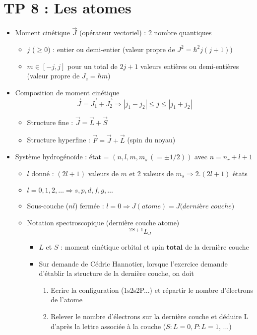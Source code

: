 
\section*{TP 8 : Les atomes}
\begin{itemize}
	\item Moment cinétique $\vec{J}$ (opérateur vectoriel) : 2 nombre quantiques
		\begin{itemize}
			\item $j$ ($\geq 0$) : entier ou demi-entier (valeur propre de $J^2 = \hbar ^2 j(j+1)$)
			\item $m \in [-j,j]$ pour un total de $2j +1$ valeurs entières ou demi-entières (valeur propre de $J_z = \hbar m$)
		\end{itemize}
		
	\item Composition de moment cinétique
	\begin{equation}
		\vec{J} = \vec{J_1}+\vec{J_2} \Rightarrow |j_1-j_2| \leq j \leq |j_1+j_2|
	\end{equation}
	\begin{itemize}
		\item Structure fine : $\vec{J}=\vec{L}+\vec{S}$
		\item Structure hyperfine : $\vec{F} = \vec{J}+\vec{L}$ (spin du noyau)
	\end{itemize}
	
	\item Système hydrogénoïde : état = $(n,l,m,m_s \, (= \pm 1/2))$ avec $n = n_r+l+1$
	\begin{itemize}
		\item $l$ donné : $(2l+1)$ valeurs de $m$ et 2 valeurs de $m_s \Rightarrow 2.(2l+1)$ états
		
		\item $l = 0,1,2, \dots \Rightarrow s,p,d,f,g,\dots$
		
		\item Sous-couche ($nl$) fermée : $l = 0 \Rightarrow J(atome) = J(dernière$ $couche)$
		
		\item Notation spectroscopique (dernière couche atome)
		\begin{equation}
			^{2S+1}L_J
		\end{equation}
		\begin{itemize}
			\item $L$ et $S$ : moment cinétique orbital et spin \textbf{total} de la dernière couche
			
			\item Sur demande de Cédric Hannotier, lorsque l'exercice demande d'établir la structure de la dernière couche, on doit 
			\begin{enumerate}
				\item Ecrire la configuration (1s2s2P...) et répartir le nombre d'électrons de l'atome
				\item Relever le nombre d'électrons sur la dernière couche et déduire L d'après la lettre associée à la couche ($S : L=0, P : L=1$, ...)
				

\end{enumerate}
\end{itemize}
\end{itemize}
\end{itemize}
